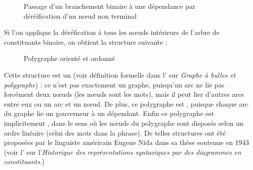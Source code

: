\begin{figure}

\caption{\label{fig:}Passage d’un branchement binaire à une dépendance par déréification d’un nœud non terminal}

\end{figure}

Si l’on applique la déréfication à tous les nœuds intérieurs de l’arbre de constituants binaire, on obtient la structure suivante :

\begin{figure}

\caption{\label{fig:}Polygraphe orienté et ordonné}

\end{figure}

Cette structure est un  (voir définition formelle dans l’ sur \textit{Graphe à bulles et polygraphe}) : ce n’est pas exactement un graphe, puisqu’un arc ne lie pas forcément deux nœuds (les nœuds sont les mots), mais il peut lier d’autres arcs entre eux ou un arc et un nœud. De plus, ce polygraphe est , puisque chaque arc du graphe lie un gouverneur à un dépendant. Enfin ce polygraphe est implicitement , dans le sens où les nœuds du polygraphe sont disposés selon un ordre linéaire (celui des mots dans la phrase). De telles structures ont été proposées par le linguiste américain Eugene Nida dans sa thèse soutenue en 1943 (voir l’ sur l’\textit{Historique des représentations syntaxiques par des diagrammes en constituants}.)

